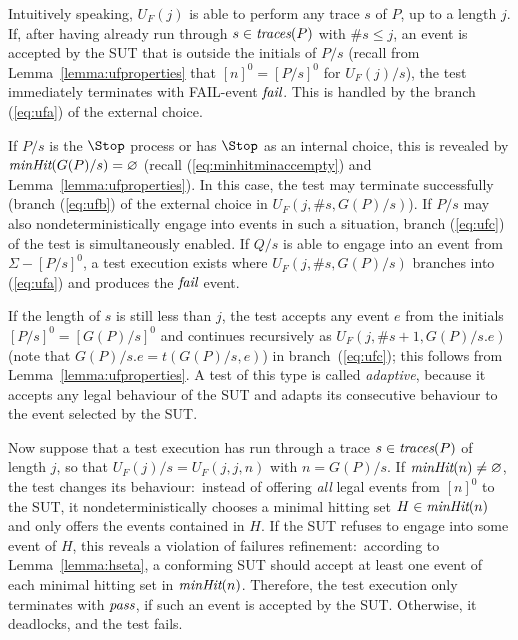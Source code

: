 Intuitively speaking, $U_F(j)$ is able to perform any trace $s$ of $P$, up to
a length $j$. If, after having already run through $s\in\text{\it traces}(P)$ with $\#s
\le j$, an event is accepted by the SUT that is outside the initials of $P/s$
 (recall from Lemma~\ref{lemma:ufproperties} that $[n]^0 = [P/s]^0$ for $U_F(j)/s$),
the test immediately terminates with FAIL-event ${\text{\it fail}}$. This is handled by
the branch (\ref{eq:ufa}) of the external choice. %

If $P/s$ is the $\Stop$ process or has $\Stop$ as an internal choice, this is
revealed by $\text{\it minHit}(G(P)/s) = \varnothing$ (recall
(\ref{eq:minhitminaccempty}) and Lemma~\ref{lemma:ufproperties}). In this
case, the test may terminate successfully (branch (\ref{eq:ufb}) of the
external choice in $U_F(j,\#s,G(P)/s)$). If $P/s$ may also
nondeterministically engage into events in such a situation, branch
(\ref{eq:ufc}) of the test is simultaneously enabled. If $Q/s$ is able to
engage into an event from $\Sigma - [P/s]^0$, a test execution exists where
$U_F(j,\#s,G(P)/s)$ branches into (\ref{eq:ufa}) and produces the ${\text{\it fail}}$
event.

If the length of $s$ is still less than $j$, the test accepts any event $e$
from the initials $[P/s]^0 = [G(P)/s]^0$ and continues recursively as
$U_F(j,\#s+1,G(P)/s.e)$ (note that $G(P)/s.e = t(G(P)/s,e)$)
in branch~(\ref{eq:ufc}); this follows from
Lemma~\ref{lemma:ufproperties}. A test of this type is called
\emph{adaptive}, because it accepts any legal behaviour of the SUT and adapts
its consecutive behaviour to the event selected by the SUT.

Now suppose that a test execution has run through a trace
$s\in\text{\it traces}(P)$ of length $j$, so that $U_F(j)/s = U_F(j,j,n)$ with $n =
G(P)/s$. If $\text{\it minHit}(n)\neq \varnothing$, the test changes its
behaviour:~instead of offering {\it all} legal events from $[n]^0$ to the
SUT, it nondeterministically chooses a minimal hitting set $H\in \text{\it minHit}(n)$
and only offers the events contained in $H$. If the SUT refuses to engage
into some event of $H$, this reveals a violation of failures
refinement:~according to Lemma~\ref{lemma:hseta}, a conforming SUT should
accept at least one event of each minimal hitting set in $\text{\it minHit}(n)$.
Therefore, the test execution only terminates with  ${\text{\it pass}}$, if such an
event is accepted by the SUT. Otherwise, it deadlocks, and the test fails.

